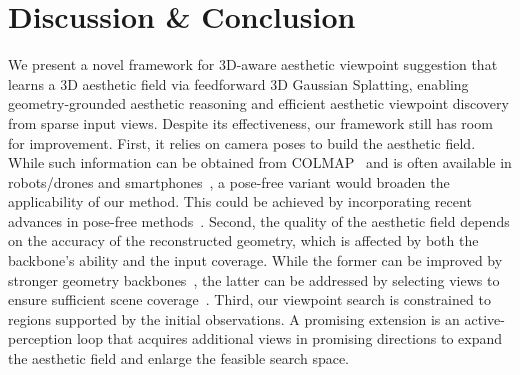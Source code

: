 \section{Discussion \& Conclusion}

We present a novel framework for 3D-aware aesthetic viewpoint suggestion that learns a 3D aesthetic field via feedforward 3D Gaussian Splatting, enabling geometry-grounded aesthetic reasoning and efficient aesthetic viewpoint discovery from sparse input views.
Despite its effectiveness, our framework still has room for improvement.
First, it relies on camera poses to build the aesthetic field. While such information can be obtained from COLMAP~\cite{schonberger2016structure} and is often available in robots/drones and smartphones~\cite{apple_arkit}, a pose-free variant would broaden the applicability of our method. This could be achieved by incorporating recent advances in pose-free methods~\cite{ye2024no,jiang2025anysplat}.
Second, the quality of the aesthetic field depends on the accuracy of the reconstructed geometry, which is affected by both the backbone’s ability and the input coverage. While the former can be improved by stronger geometry backbones~\cite{wang2025vggt}, the latter can be addressed by selecting views to ensure sufficient scene coverage~\cite{xiao2024nerf,chen2024gennbv}. 
Third, our viewpoint search is constrained to regions supported by the initial observations. A promising extension is an active-perception loop that acquires additional views in promising directions to expand the aesthetic field and enlarge the feasible search space.
